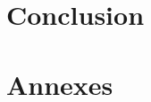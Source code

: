 \documentclass{article}
\begin{document}
    \section{Conclusion}\label{sec:conclusion}

    \section{Annexes}\label{sec:annexes}



    \tableofcontents
\end{document}
